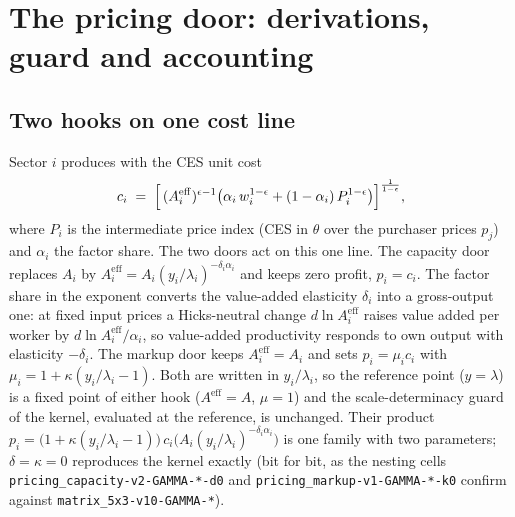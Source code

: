\section{The pricing door: derivations, guard and accounting}\label{app:pricing-door}

\subsection{Two hooks on one cost line}\label{app:pricing-hooks}
Sector $i$ produces with the CES unit cost
\begin{equation}\label{eq:app-unit-cost}
  c_i \;=\; \Bigl[\,(A^{\mathrm{eff}}_i)^{\epsilon-1}\bigl(\alpha_i\,w_i^{1-\epsilon}
     + (1-\alpha_i)\,P_i^{1-\epsilon}\bigr)\Bigr]^{\frac{1}{1-\epsilon}},
\end{equation}
where $P_i$ is the intermediate price index (CES in $\theta$ over the
purchaser prices $p_j$) and $\alpha_i$ the factor share. The two doors act on
this one line. The capacity door replaces $A_i$ by
$A^{\mathrm{eff}}_i = A_i (y_i/\lambda_i)^{-\delta_i \alpha_i}$ and keeps zero profit,
$p_i = c_i$. The factor share in the exponent converts the value-added
elasticity $\delta_i$ into a gross-output one: at fixed input prices a
Hicks-neutral change $d\ln A^{\mathrm{eff}}_i$ raises value added per worker by
$d\ln A^{\mathrm{eff}}_i/\alpha_i$, so value-added productivity responds to own
output with elasticity $-\delta_i$. The markup door keeps $A^{\mathrm{eff}}_i = A_i$ and sets
$p_i = \mu_i c_i$ with $\mu_i = 1 + \kappa(y_i/\lambda_i - 1)$. Both are
written in $y_i/\lambda_i$, so the reference point ($y = \lambda$) is a
fixed point of either hook ($A^{\mathrm{eff}} = A$, $\mu = 1$) and the
scale-determinacy guard of the kernel, evaluated at the reference, is
unchanged. Their product
$p_i = \bigl(1 + \kappa(y_i/\lambda_i - 1)\bigr)\,c_i\bigl(A_i (y_i/\lambda_i)^{-\delta_i\alpha_i}\bigr)$
is one family with two parameters; $\delta = \kappa = 0$ reproduces the
kernel exactly (bit for bit, as the nesting cells
\texttt{pricing\_capacity-v2-GAMMA-*-d0} and
\texttt{pricing\_markup-v1-GAMMA-*-k0} confirm against
\texttt{matrix\_5x3-v10-GAMMA-*}).

